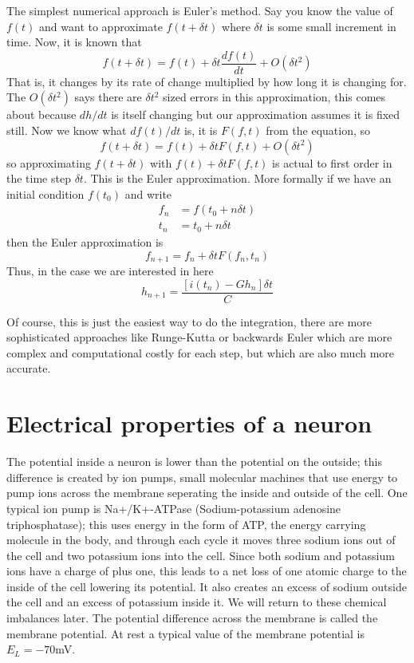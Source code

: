 \documentclass[11pt,a4paper]{scrartcl}
\begin{document}
The simplest numerical approach is Euler's method. Say you know the value of $f(t)$ and want to approximate $f(t+\delta t)$ where $\delta t$ is some small increment in time. Now, it is known that
\begin{equation}
f(t+\delta t)=f(t)+\delta t \frac{df(t)}{dt}+O(\delta t^2)
\end{equation}
That is, it changes by its rate of change multiplied by how long it is
changing for. The $O(\delta t^2)$ says there are $\delta t^2$ sized
errors in this approximation, this comes about because $dh/dt$ is
itself changing but our approximation assumes it is fixed still. Now we
know what $df(t)/dt$ is, it is $F(f,t)$ from the equation, so
\begin{equation}
f(t+\delta t)=f(t)+\delta t F(f,t) + O(\delta t^2)
\end{equation}
so approximating $f(t+\delta t)$ with $f(t)+\delta t F(f,t)$ is actual
to first order in the time step $\delta t$. This is the Euler
approximation. More formally if we have an initial condition $f(t_0)$ and write
\begin{align}
f_n&=f(t_0+n\delta t)\\
t_n&=t_0+n\delta t
\end{align}
then the Euler approximation is
\begin{equation}
f_{n+1}=f_n+\delta t F(f_n,t_n)
\end{equation}
Thus, in the case we are interested in here
\begin{equation}
h_{n+1}=\frac{[i(t_n)-Gh_n]\delta t}{C}
\end{equation}

Of course, this is just the easiest way to do the integration, there
are more sophisticated approaches like Runge-Kutta or backwards Euler
which are more complex and computational costly for each step, but
which are also much more accurate.

\section*{Electrical properties of a neuron}
The potential inside a neuron is lower than the potential on the
outside; this difference is created by ion pumps, small molecular
machines that use energy to pump ions across the membrane seperating
the inside and outside of the cell. One typical ion pump is
Na+/K+-ATPase (Sodium-potassium adenosine triphosphatase); this uses
energy in the form of ATP, the energy carrying molecule in the body,
and through each cycle it moves three sodium ions out of the cell and
two potassium ions into the cell. Since both sodium and potassium ions
have a charge of plus one, this leads to a net loss of one atomic
charge to the inside of the cell lowering its potential. It also
creates an excess of sodium outside the cell and an excess of
potassium inside it. We will return to these chemical imbalances
later. The potential difference across the membrane is called the
membrane potential. At rest a typical value of the membrane
potential is $E_L=-70 $mV. 
\end{document}
